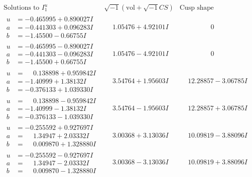 \documentclass[1p]{elsarticle_modified}
\theoremstyle{definition}
\newcommand{\I}{\sqrt{-1}}
\begin{document}
$$\begin{array}{c|c|c}  
\text{Solutions to }I^u_{1}& \I (\text{vol} + \sqrt{-1}CS) & \text{Cusp shape}\\
 \hline 
\begin{aligned}
u &= -0.465995 + 0.890027 I \\
a &= -0.441303 + 0.096283 I \\
b &= -1.45500 - 0.66755 I\end{aligned}
 & \phantom{-}1.05476 + 4.92101 I & \phantom{-0.000000 } 0 \\ \hline\begin{aligned}
u &= -0.465995 - 0.890027 I \\
a &= -0.441303 - 0.096283 I \\
b &= -1.45500 + 0.66755 I\end{aligned}
 & \phantom{-}1.05476 - 4.92101 I & \phantom{-0.000000 } 0 \\ \hline\begin{aligned}
u &= \phantom{-}0.138898 + 0.959842 I \\
a &= -1.40999 + 1.38132 I \\
b &= -0.376133 + 1.039330 I\end{aligned}
 & \phantom{-}3.54764 + 1.95603 I & \phantom{-}12.28857 - 3.06785 I \\ \hline\begin{aligned}
u &= \phantom{-}0.138898 - 0.959842 I \\
a &= -1.40999 - 1.38132 I \\
b &= -0.376133 - 1.039330 I\end{aligned}
 & \phantom{-}3.54764 - 1.95603 I & \phantom{-}12.28857 + 3.06785 I \\ \hline\begin{aligned}
u &= -0.255592 + 0.927697 I \\
a &= \phantom{-}1.34947 + 2.03332 I \\
b &= \phantom{-}0.009870 + 1.328880 I\end{aligned}
 & \phantom{-}3.00368 + 3.13036 I & \phantom{-}10.09819 - 3.88096 I \\ \hline\begin{aligned}
u &= -0.255592 - 0.927697 I \\
a &= \phantom{-}1.34947 - 2.03332 I \\
b &= \phantom{-}0.009870 - 1.328880 I\end{aligned}
 & \phantom{-}3.00368 - 3.13036 I & \phantom{-}10.09819 + 3.88096 I \\ \hline\begin{aligned}

\end{aligned}
\end{array}$$
\end{document}
